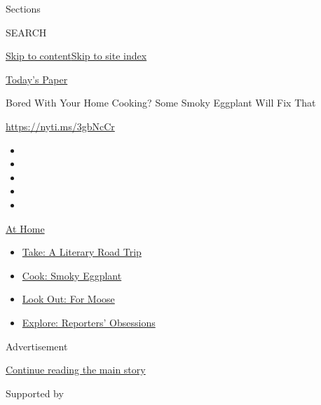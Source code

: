 Sections

SEARCH

\protect\hyperlink{site-content}{Skip to
content}\protect\hyperlink{site-index}{Skip to site index}

\href{https://myaccount.nytimes.com/auth/login?response_type=cookie\&client_id=vi}{}

\href{https://www.nytimes.com/section/todayspaper}{Today's Paper}

Bored With Your Home Cooking? Some Smoky Eggplant Will Fix That

\url{https://nyti.ms/3gbNcCr}

\begin{itemize}
\item
\item
\item
\item
\item
\end{itemize}

\href{https://www.nytimes.com/spotlight/at-home?action=click\&pgtype=Article\&state=default\&region=TOP_BANNER\&context=at_home_menu}{At
Home}

\begin{itemize}
\tightlist
\item
  \href{https://www.nytimes.com/2020/07/28/books/time-for-a-literary-road-trip.html?action=click\&pgtype=Article\&state=default\&region=TOP_BANNER\&context=at_home_menu}{Take:
  A Literary Road Trip}
\item
  \href{https://www.nytimes.com/2020/07/29/magazine/bored-with-your-home-cooking-some-smoky-eggplant-will-fix-that.html?action=click\&pgtype=Article\&state=default\&region=TOP_BANNER\&context=at_home_menu}{Cook:
  Smoky Eggplant}
\item
  \href{https://www.nytimes.com/2020/07/27/travel/moose-michigan-isle-royale.html?action=click\&pgtype=Article\&state=default\&region=TOP_BANNER\&context=at_home_menu}{Look
  Out: For Moose}
\item
  \href{https://www.nytimes.com/interactive/2020/at-home/even-more-reporters-editors-diaries-lists-recommendations.html?action=click\&pgtype=Article\&state=default\&region=TOP_BANNER\&context=at_home_menu}{Explore:
  Reporters' Obsessions}
\end{itemize}

Advertisement

\protect\hyperlink{after-top}{Continue reading the main story}

Supported by

